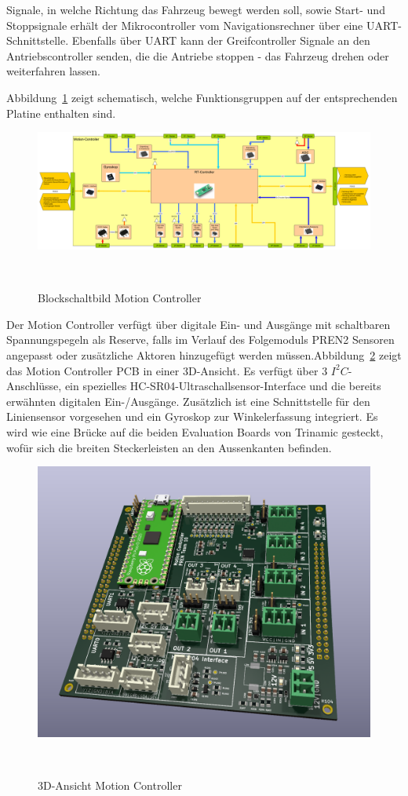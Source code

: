 \documentclass[main.tex]{subfiles} %
\begin{document}
Signale, in welche Richtung das Fahrzeug bewegt werden soll, sowie Start- und
Stoppsignale erhält der Mikrocontroller vom Navigationsrechner über eine
UART-Schnittstelle. Ebenfalls über UART kann der Greifcontroller Signale an den
Antriebscontroller senden, die die Antriebe stoppen - das Fahrzeug drehen oder
weiterfahren lassen.

Abbildung~\ref{fig:Blockschaltbild_Motioncontroller} zeigt schematisch, welche
Funktionsgruppen auf der entsprechenden Platine enthalten sind.

\begin{figure}[H]
    \centering
    \includegraphics[width = 1\linewidth]{fig_Antriebe_und_Dimensionierung/MotionController_Blockschaltbild.pdf}
    \caption{Blockschaltbild Motion Controller}~\label{fig:Blockschaltbild_Motioncontroller}
\end{figure}

Der Motion Controller verfügt über digitale Ein- und Ausgänge mit schaltbaren
Spannungspegeln als Reserve, falls im Verlauf des Folgemoduls PREN2 Sensoren
angepasst oder zusätzliche Aktoren hinzugefügt werden
müssen.Abbildung~\ref{fig:MotionBoard_PCB} zeigt das Motion Controller PCB in
einer 3D-Ansicht. Es verfügt über 3 $I^2C$-Anschlüsse, ein spezielles
HC-SR04-Ultraschallsensor-Interface und die bereits erwähnten digitalen
Ein-/Ausgänge. Zusätzlich ist eine Schnittstelle für den Liniensensor
vorgesehen und ein Gyroskop zur Winkelerfassung integriert. Es wird wie eine
Brücke auf die beiden Evaluation Boards von Trinamic gesteckt, wofür sich die
breiten Steckerleisten an den Aussenkanten befinden.

\begin{figure}[H]
    \centering
    \includegraphics[width = 0.75\linewidth]{fig_Antriebe_und_Dimensionierung/MotionControllerPCB.jpg}
    \caption{3D-Ansicht Motion Controller}~\label{fig:MotionBoard_PCB}
\end{figure}
\end{document}
